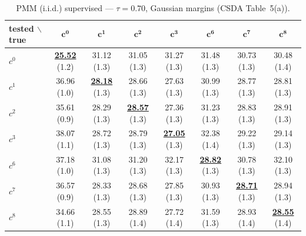\begin{table}[htbp]
  \centering
  \small
  \setlength{\tabcolsep}{4pt}
  \caption{PMM (i.i.d.) supervised — $\tau = 0.70$, Gaussian margins (CSDA Table~5(a)).}
  \label{tab:exp2-high_tau_gauss}
  \begin{tabular}{lccccccc}
    \toprule
    tested $\backslash$ true & $\mathbf{c^{0}}$ & $\mathbf{c^{1}}$ & $\mathbf{c^{2}}$ & $\mathbf{c^{3}}$ & $\mathbf{c^{6}}$ & $\mathbf{c^{7}}$ & $\mathbf{c^{8}}$ \\
    \midrule
    $c^{0}$ & \textbf{\underline{25.52}} (1.2) & 31.12 (1.3) & 31.05 (1.3) & 31.27 (1.3) & 31.48 (1.3) & 30.73 (1.3) & 30.48 (1.4) \\
    $c^{1}$ & 36.96 (1.0) & \textbf{\underline{28.18}} (1.3) & 28.66 (1.3) & 27.63 (1.3) & 30.99 (1.3) & 28.77 (1.3) & 28.81 (1.3) \\
    $c^{2}$ & 35.61 (0.9) & 28.29 (1.3) & \textbf{\underline{28.57}} (1.3) & 27.36 (1.3) & 31.23 (1.3) & 28.83 (1.3) & 28.91 (1.3) \\
    $c^{3}$ & 38.07 (1.1) & 28.72 (1.3) & 28.79 (1.3) & \textbf{\underline{27.05}} (1.3) & 32.38 (1.4) & 29.22 (1.3) & 29.14 (1.3) \\
    $c^{6}$ & 37.18 (1.0) & 31.08 (1.3) & 31.20 (1.3) & 32.17 (1.3) & \textbf{\underline{28.82}} (1.3) & 30.78 (1.3) & 32.10 (1.3) \\
    $c^{7}$ & 36.57 (0.9) & 28.33 (1.3) & 28.68 (1.3) & 27.85 (1.3) & 30.93 (1.3) & \textbf{\underline{28.71}} (1.3) & 28.94 (1.3) \\
    $c^{8}$ & 34.66 (1.1) & 28.55 (1.3) & 28.89 (1.4) & 27.72 (1.4) & 31.59 (1.3) & 28.93 (1.4) & \textbf{\underline{28.55}} (1.4) \\
    \bottomrule
  \end{tabular}
\end{table}
